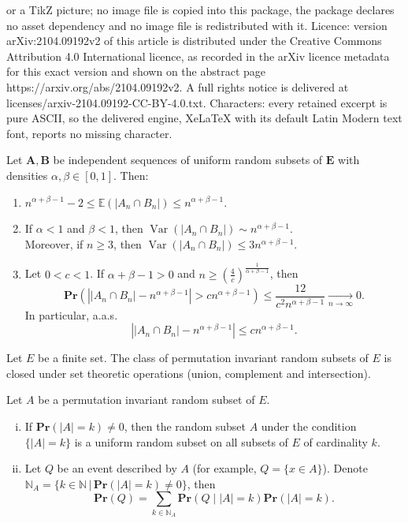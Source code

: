\documentclass[10pt,a4paper]{amsart}
\def\Pr{\mathbf{Pr}}
\DeclareMathOperator{\Var}{Var}
\newcommand{\bs}{\boldsymbol}
\newcommand{\tendvers}{\xrightarrow[n\to\infty]{}}
\begin{document}
or a TikZ picture; no image file is copied into this package, the package declares no asset dependency and no image file is redistributed with it. Licence: version arXiv:2104.09192v2 of this article is distributed under the Creative Commons Attribution 4.0 International licence, as recorded in the arXiv licence metadata for this exact version and shown on the abstract page https://arxiv.org/abs/2104.09192v2. A full rights notice is delivered at licenses/arxiv-2104.09192-CC-BY-4.0.txt. Characters: every retained excerpt is pure ASCII, so the delivered engine, XeLaTeX with its default Latin Modern text font, reports no missing character.
\begin{lem}\label{concentration uniform} Let $\bs A,\bs B$ be independent sequences of uniform random subsets of $\bs E$ with densities $\alpha,\beta\in [0,1]$. Then:
\begin{enumerate}[$(i)$]
    \item $n^{\alpha+\beta-1}-2\leq \mathbb{E}(|A_n\cap B_n|) \leq n^{\alpha+\beta-1}$.
    \item If $\alpha<1$ and $\beta <1$, then $\Var(|A_n\cap B_n|) \sim n^{\alpha+\beta-1}$.\\[6pt]
   Moreover, if $n\geq 3$, then $\Var(|A_n\cap B_n|) \leq 3n^{\alpha+\beta-1}$.
    \item Let $0<c<1$. If $\alpha+\beta - 1 > 0$ and $n\geq \left(\frac{4}{c}\right)^{\frac{1}{\alpha+\beta-1}}$, then
    \[\Pr\left(\left||A_n\cap B_n|-n^{\alpha+\beta-1}\right|> cn^{\alpha+\beta-1}\right)\leq \frac{12}{c^2n^{\alpha+\beta-1}}\tendvers 0.\] 
    In particular, a.a.s.
    \[\left||A_n\cap B_n|-n^{\alpha+\beta-1}\right| \leq cn^{\alpha+\beta-1}.\]
\end{enumerate}
\end{lem}

\begin{lem} \label{closed} Let $E$ be a finite set. The class of permutation invariant random subsets of $E$ is closed under set theoretic operations (union, complement and intersection).
\end{lem}

\begin{prop} \label{decomposition} Let $A$ be a permutation invariant random subset of $E$. 
\begin{enumerate} [(i)]
    \item If $\Pr(|A| = k)\neq 0$, then the random subset $A$ under the condition $\{|A| = k\}$ is a uniform random subset on all subsets of $E$ of cardinality $k$.
    \item Let $Q$ be an event described by $A$ (for example, $Q = \{x\in A\}$). Denote $\mathbb{N}_A = \{k\in \mathbb{N}\,|\,\Pr(|A|=k)\neq 0\}$, then
\[\Pr(Q) = \sum_{k\in \mathbb{N}_A}\Pr(Q\mid|A| = k)\Pr(|A|=k).\]
\end{enumerate}
\end{prop}
\end{document}
